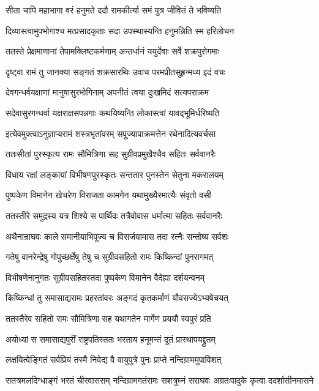 \twolineshloka
{सीता चापि महाभागा वरं हनुमते ददौ}
{रामकीर्त्या समं पुत्र जीवितं ते भविष्यति}


\twolineshloka
{दिव्यास्त्वामुपभोगाश्च मत्प्रसादकृताः सदा}
{उपस्थास्यन्ति हनुमन्निति स्म हरिलोचन}


\twolineshloka
{ततस्ते प्रेक्षमाणानां तेपामक्लिष्टकर्मणाम्}
{अन्तर्धानं ययुर्देवाः सर्वे शक्रपुरोगमाः}


\twolineshloka
{दृष्ट्वा रामं तु जानक्या सङ्गतं शक्रसारथिः}
{उवाच परमप्रीतसुहृन्मध्य इदं वचः}


\twolineshloka
{देवगन्धर्वयक्षाणां मानुषासुरभोगिनाम्}
{अपनीतं त्वया दुःखमिदं सत्यपराक्रम}


\twolineshloka
{सदेवासुरगन्धर्वा यक्षराक्षसपन्नगाः}
{कथयिष्यन्ति लोकास्त्वां यावद्भूमिर्धरिष्यति}


\twolineshloka
{इत्येवमुक्त्वाऽनुज्ञाप्यरामं शस्त्रभृतांवरम्}
{सपूज्यापाक्रमत्तेन रथेनादित्यवर्चसा}


\twolineshloka
{ततःसीतां पुरस्कृत्य रामः सौमित्रिणा सह}
{सुग्रीवप्रमुखैश्चैव सहितः सर्ववानरैः}


\twolineshloka
{विधाय रक्षां लङ्कायां विभीषणपुरस्कृतः}
{सन्ततार पुनस्तेन सेतुना मकरालयम्}


\twolineshloka
{पुष्पकेण विमानेन खेचरेण विराजता}
{कामगेन यथामुख्यैरमात्यैः संवृतो वसी}


\twolineshloka
{ततस्तीरे समुद्रस्य यत्र शिश्ये स पार्थिवः}
{तत्रैवोवास धर्मात्मा सहितः सर्ववानरैः}


\twolineshloka
{अथैनान्राघवः काले समानीयाभिपूज्य च}
{विसर्जयामास तदा रत्नैः सन्तोष्य सर्वशः}


\twolineshloka
{गतेषु वानरेन्द्रेषु गोपुच्छर्क्षेषु तेषु च}
{सुग्रीवसहितो रामः किष्किन्दां पुनरागमत्}


\twolineshloka
{विभीषणेनानुगतः सुग्रीवसहितस्तदा}
{पुष्पकेण विमानेन वैदेह्या दर्शयन्वनम्}


\twolineshloka
{किष्किन्धां तु समासाद्यरामः प्रहरतांवरः}
{अङ्गदं कृतकर्माणं यौवराज्येऽभ्यषेचयत्}


\twolineshloka
{ततस्तैरेव सहितो रामः सौमित्रिणा सह}
{यथागतेन मार्गेण प्रययौ स्वपुरं प्रति}


\twolineshloka
{अयोध्यां स समासाद्यपुरीं राष्ट्रपतिस्ततः}
{भरताय हनूमन्तं दूतं प्रास्थापयद्द्रुतम्}


\twolineshloka
{लक्षयित्वेङ्गितं सर्वप्रियं तस्मै निवेद्य वै}
{वायुपुत्रे पुनः प्राप्ते नन्दिग्राममुपाविशत्}


\threelineshloka
{सतत्रमलदिग्धाङ्गं भरतं चीरवाससम्}
{नन्दिग्रामगतंरामः सशत्रुघ्नं सराघवः}
{अग्रतःपादुके कृत्वा ददर्शासीनमासने}


